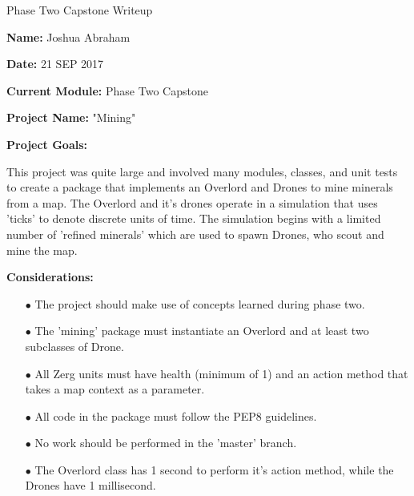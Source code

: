\documentclass{article}
\begin{document}
\centerline{\sc \large Phase Two Capstone Writeup}
\vspace{.5pc}

\begin{flushleft}
\textbf{Name:} Joshua Abraham
\vspace{.5pc}

\textbf{Date:} 21 SEP 2017
\vspace{.5pc}

\textbf{Current Module:} Phase Two Capstone
\vspace{.5pc}

\textbf{Project Name:} "Mining"
\vspace{.5pc}

\textbf{Project Goals:}
\vspace{.5pc}
\end{flushleft}

This project was quite large and involved many modules, classes, and unit
tests to create a package that implements an Overlord and Drones to mine
minerals from a map. The Overlord and it's drones operate in a simulation
that uses 'ticks' to denote discrete units of time. The simulation begins
with a limited number of 'refined minerals' which are used to spawn Drones,
who scout and mine the map.
\vspace{.5pc}

\begin{flushleft}
\textbf{Considerations:}
\vspace{.5pc}
\end{flushleft}

\begin{itemize}
	\item[$\bullet$] The project should make use of concepts learned during
	phase two.
	\item[$\bullet$] The 'mining' package must instantiate an Overlord and
	at least two subclasses of Drone.
	\item[$\bullet$] All Zerg units must have health (minimum of 1) and an
	action method that takes a map context as a parameter.
	\item[$\bullet$] All code in the package must follow the PEP8 guidelines.
	\item[$\bullet$] No work should be performed in the 'master' branch.
	\item[$\bullet$] The Overlord class has 1 second to perform it's action
	method, while the Drones have 1 millisecond.
\end{itemize}
\vspace{.5pc}
\end{document}
